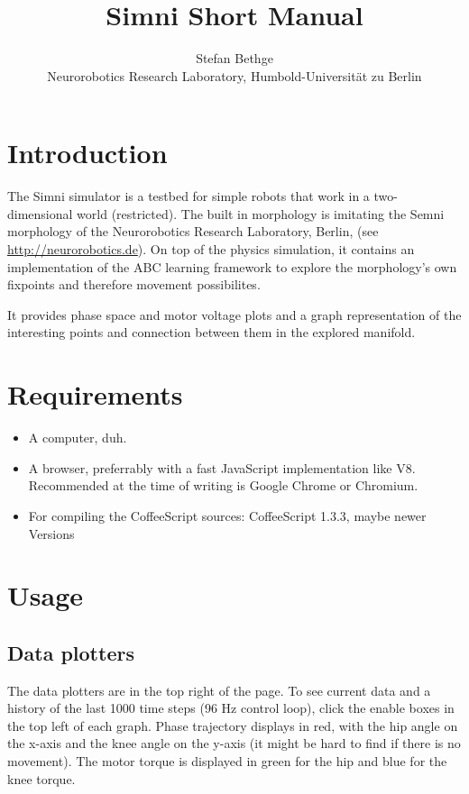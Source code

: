 \documentclass[10pt,a4paper]{article}
\begin{document}
\title{Simni Short Manual}
\author{Stefan Bethge\\
Neurorobotics Research Laboratory, Humbold-Universität zu Berlin}

\maketitle
\tableofcontents
\newpage
{}

\section{Introduction}

The Simni simulator is a testbed for simple robots that work in a two-dimensional world (restricted). The built in morphology is imitating the Semni morphology of the Neurorobotics Research Laboratory, Berlin, (see \url{http://neurorobotics.de}).
On top of the physics simulation, it contains an implementation of the ABC learning framework to explore the morphology's own fixpoints and therefore movement possibilites.

It provides phase space and motor voltage plots and a graph representation of the interesting points and connection between them in the explored manifold.

\section{Requirements}

\begin{itemize}
\item A computer, duh.
\item A browser, preferrably with a fast JavaScript implementation like V8. Recommended at the time of writing is Google Chrome or Chromium.
\item For compiling the CoffeeScript sources: CoffeeScript 1.3.3, maybe newer Versions

\end{itemize}

\section{Usage}

\subsection{Data plotters}

The data plotters are in the top right of the page.
To see current data and a history of the last 1000 time steps (96 Hz control loop), click the enable boxes in the top left of each graph. Phase trajectory displays in red, with the hip angle on the x-axis and the knee angle on the y-axis (it might be hard to find if there is no movement). The motor torque is displayed in green for the hip and blue for the knee torque.
\end{document}
